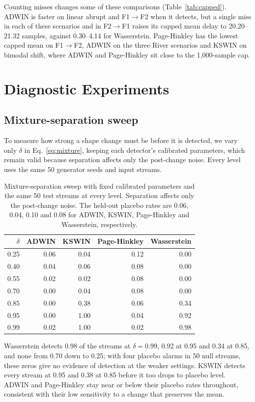 \documentclass[preprint,12pt]{elsarticle}
\begin{document}
Counting misses changes some of these comparisons (Table~\ref{tab:capped}). ADWIN is faster on linear abrupt and F1$\to$F2 when it detects, but a single miss in each of these scenarios and in F2$\to$F1 raises its capped mean delay to 20.20--21.32 samples, against 0.30--4.14 for Wasserstein. Page-Hinkley has the lowest capped mean on F1$\to$F2, ADWIN on the three River scenarios and KSWIN on bimodal shift, where ADWIN and Page-Hinkley sit close to the 1,000-sample cap.

\section{Diagnostic Experiments}
\label{sec:robustness}
\subsection{Mixture-separation sweep}
\label{sec:severity}
To measure how strong a shape change must be before it is detected, we vary only $\delta$ in Eq.~\eqref{eq:mixture}, keeping each detector's calibrated parameters, which remain valid because separation affects only the post-change noise. Every level uses the same 50 generator seeds and input streams.

\begin{table}[htbp]\centering\small
\caption{Mixture-separation sweep with fixed calibrated parameters and the same 50 test streams at every level. Separation affects only the post-change noise. The held-out placebo rates are 0.06, 0.04, 0.10 and 0.08 for ADWIN, KSWIN, Page-Hinkley and Wasserstein, respectively.}\label{tab:severity}
\setlength{\tabcolsep}{4pt}\begin{tabular}{rrrrr}
\toprule
$\delta$ & ADWIN & KSWIN & Page-Hinkley & Wasserstein\\\midrule
0.25 & 0.06 & 0.04 & 0.12 & 0.00\\
0.40 & 0.04 & 0.06 & 0.08 & 0.00\\
0.55 & 0.02 & 0.02 & 0.08 & 0.00\\
0.70 & 0.00 & 0.04 & 0.08 & 0.00\\
0.85 & 0.00 & 0.38 & 0.06 & 0.34\\
0.95 & 0.00 & 1.00 & 0.04 & 0.92\\
0.99 & 0.02 & 1.00 & 0.02 & 0.98\\
\bottomrule\end{tabular}\end{table}

Wasserstein detects 0.98 of the streams at $\delta=0.99$, 0.92 at 0.95 and 0.34 at 0.85, and none from 0.70 down to 0.25; with four placebo alarms in 50 null streams, these zeros give no evidence of detection at the weaker settings. KSWIN detects every stream at 0.95 and 0.38 at 0.85 before it too drops to placebo level. ADWIN and Page-Hinkley stay near or below their placebo rates throughout, consistent with their low sensitivity to a change that preserves the mean.
\end{document}
